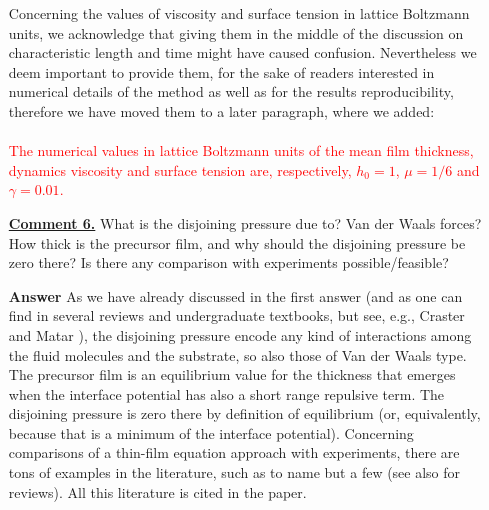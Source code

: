 \documentclass[12pt,english]{article}
\begin{document}
\begin{itemize}
{Concerning the values of viscosity and surface tension in lattice Boltzmann units, 
we acknowledge that giving them in the middle of the discussion on characteristic length and time might  
have caused confusion. Nevertheless we deem important to provide them, for the sake of readers interested 
in numerical details of the method as well as for the results reproducibility, therefore we have moved them 
to a later paragraph, where we added: \\
\\
\textcolor{red}{The numerical values in lattice Boltzmann units of the 
mean film thickness, dynamics viscosity and surface tension are, respectively, $h_0=1$, $\mu=1/6$
and $\gamma=0.01$.}
}


\item[ \textbf{\underline{Comment 6.}}]
{ 
What is the disjoining pressure due to? 
Van der Waals forces? 
How thick is the precursor film, and why should the disjoining pressure be zero there?
Is there any comparison with experiments possible/feasible?
}

\item[ \textbf{{Answer}}]
{
As we have already discussed in the first answer (and as one can find 
in several reviews and undergraduate textbooks, but see, e.g., Craster 
and Matar \cite{craster2009dynamics}), the disjoining pressure encode 
any kind of interactions among the fluid molecules and the substrate, so 
also those of Van der Waals type. The precursor film is an equilibrium value for the thickness that emerges when the interface potential has also a short 
range repulsive term. The disjoining pressure is zero there by definition of equilibrium (or, equivalently, because that is a minimum of the interface potential). Concerning comparisons of a thin-film equation approach with 
experiments, there are tons of examples in the literature, such as 
\cite{becker2003complex,fetzer2005new,PhysRevLett.99.114503} to name but a few (see also \cite{craster2009dynamics,RevModPhys.81.739} for reviews). All this literature is cited in the paper.
}

\end{itemize}




\end{document}
